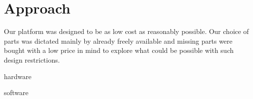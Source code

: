\documentclass[class=article, crop=false]{standalone}
\begin{document}
\chapter{Approach}\label{cha:approach}

Our platform was designed to be as low cost as reasonably possible. Our choice of parts was dictated mainly by already freely available and missing parts were bought with a low price in mind to explore what could be possible with such design restrictions.

{hardware}

{software}
\end{document}
